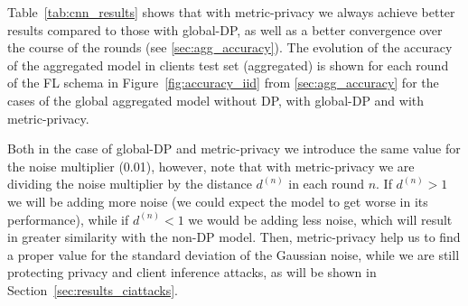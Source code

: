 \documentclass[5p,times]{elsarticle}
\begin{document}
\begin{table*}[!t]
    \centering
    \caption{Accuracy, F1-score and precision obtained in the test set with each approach. Homogeneous clients.}
    \label{tab:accuracy_test}
\end{table*}
Table~\ref{tab:cnn_results} shows that with metric-privacy we always achieve better results compared to those with global-DP, as well as a better convergence over the course of the rounds (see \ref{sec:agg_accuracy}). The evolution of the accuracy of the aggregated model in clients test set (aggregated) is shown for each round of the FL schema in Figure~\ref{fig:accuracy_iid} from \ref{sec:agg_accuracy} for the cases of the global aggregated model without DP, with global-DP and with metric-privacy.

Both in the case of global-DP and metric-privacy we introduce the same value for the noise multiplier (0.01), however, note that with metric-privacy we are dividing the noise multiplier by the distance $d^{(n)}$ in each round $n$. If $d^{(n)}>1$ we will be adding more noise (we could expect the model to get worse in its performance), while if $d^{(n)}<1$ we would be adding less noise, which will result in greater similarity with the non-DP model. Then, metric-privacy help us to find a proper value for the standard deviation of the Gaussian noise, while we are still protecting privacy and client inference attacks, as will be shown in Section~\ref{sec:results_ciattacks}. 
\end{document}
